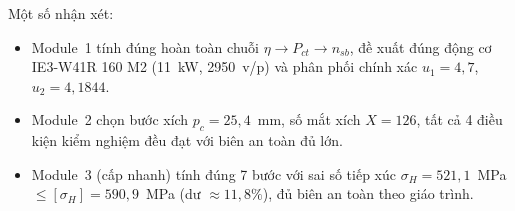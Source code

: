 Một số nhận xét:
\begin{itemize}
  \item Module~1 tính đúng hoàn toàn chuỗi $\eta \to P_{ct} \to n_{sb}$,
        đề xuất đúng động cơ IE3-W41R 160 M2 (11~kW, 2950~v/p)
        và phân phối chính xác $u_1 = 4{,}7$, $u_2 = 4{,}1844$.
  \item Module~2 chọn bước xích $p_c = 25{,}4$~mm, số mắt xích $X = 126$,
        tất cả 4 điều kiện kiểm nghiệm đều đạt với biên an toàn đủ lớn.
  \item Module~3 (cấp nhanh) tính đúng 7 bước với sai số tiếp xúc
        $\sigma_H = 521{,}1$~MPa $\leq [\sigma_H] = 590{,}9$~MPa
        (dư $\approx 11{,}8\%$), đủ biên an toàn theo giáo trình.
\end{itemize}
